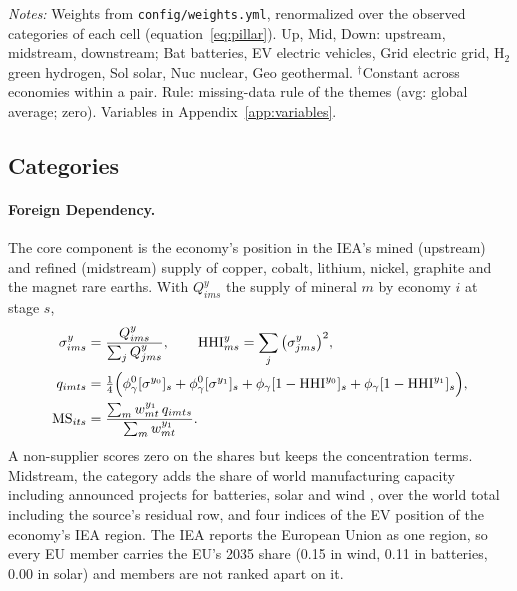 \begin{table}[tbp]
\begin{threeparttable}
\begin{tabularx}{\textwidth}
\bottomrule
\end{tabularx}
\begin{tablenotes}[flushleft]\footnotesize
\item \textit{Notes:} Weights from \texttt{config/weights.yml}, renormalized over the observed
categories of each cell (equation~\eqref{eq:pillar}). Up, Mid, Down: upstream, midstream,
downstream; Bat batteries, EV electric vehicles, Grid electric grid, H$_2$ green hydrogen, Sol
solar, Nuc nuclear, Geo geothermal. $^{\dagger}$Constant across economies within a pair. Rule:
missing-data rule of the themes (avg: global average; zero). Variables in
Appendix~\ref{app:variables}.
\end{tablenotes}
\end{threeparttable}
\end{table}

\subsection{Categories}\label{subsec:es_categories}

\paragraph{Foreign Dependency.}\label{subsec:es_fd} The core component is the economy's position in
the IEA's mined (upstream) and refined (midstream) supply of copper, cobalt, lithium, nickel,
graphite and the magnet rare earths. With $Q^{y}_{ims}$ the supply of mineral $m$ by economy $i$ at
stage $s$,
\begin{align}
  \sigma^{y}_{ims}&=\frac{Q^{y}_{ims}}{\sum_{j}Q^{y}_{jms}},\qquad
  \mathrm{HHI}^{y}_{ms}=\sum_{j}\big(\sigma^{y}_{jms}\big)^{2},\label{eq:es_fd_share}\\
  q_{imts}&=\tfrac14\Big(\phi_{\gamma}^{0}[\sigma^{y_0}]_{s}+\phi_{\gamma}^{0}[\sigma^{y_1}]_{s}
  +\phi_{\gamma}[1-\mathrm{HHI}^{y_0}]_{s}+\phi_{\gamma}[1-\mathrm{HHI}^{y_1}]_{s}\Big),\label{eq:es_fd_mineral}\\
  \mathrm{MS}_{its}&=\frac{\sum_{m}w^{y_1}_{mt}\,q_{imts}}{\sum_{m}w^{y_1}_{mt}}.
  \label{eq:es_fd_ms}
\end{align}
A non-supplier scores zero on the shares but keeps the concentration terms. Midstream, the
category adds the share of world manufacturing capacity including announced projects for
batteries, solar and wind \citep{iea2024etp}, over the world total including the source's residual
row, and four indices of the EV position of the economy's IEA region. The IEA reports the European
Union as one region, so every EU member carries the EU's 2035 share (0.15 in wind, 0.11 in
batteries, 0.00 in solar) and members are not ranked apart on it.

